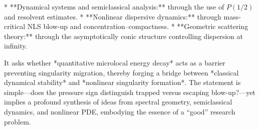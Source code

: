* **Dynamical systems and semiclassical analysis:** through the use of \(P(1/2)\) and resolvent estimates.  
* **Nonlinear dispersive dynamics:** through mass-critical NLS blow-up and concentration–compactness.  
* **Geometric scattering theory:** through the asymptotically conic structure controlling dispersion at infinity.

It asks whether *quantitative microlocal energy decay* acts as a barrier preventing singularity migration, thereby forging a bridge between *classical dynamical stability* and *nonlinear singularity formation*.  
The statement is simple—does the pressure sign distinguish trapped versus escaping blow-up?—yet implies a profound synthesis of ideas from spectral geometry, semiclassical dynamics, and nonlinear PDE, embodying the essence of a “good” research problem.